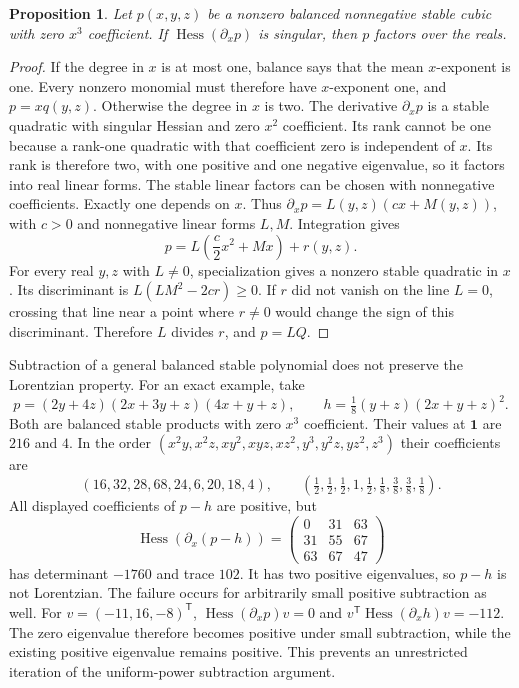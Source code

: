 \documentclass[11pt,a4paper]{article}
\newtheorem{proposition}[theorem]{Proposition}
\theoremstyle{definition}
\theoremstyle{remark}
\newcommand{\T}{\mathsf{T}}
\begin{document}
\begin{proposition}\label{prop:lp-cubic-rigidity}
Let $p(x,y,z)$ be a nonzero balanced nonnegative stable cubic with zero $x^3$ coefficient.
If $\operatorname{Hess}(\partial_xp)$ is singular, then $p$ factors over the reals.
\end{proposition}
\begin{proof}
If the degree in $x$ is at most one, balance says that the mean $x$-exponent is one.
Every nonzero monomial must therefore have $x$-exponent one, and $p=xq(y,z)$.
Otherwise the degree in $x$ is two.
The derivative $\partial_xp$ is a stable quadratic with singular Hessian and zero $x^2$ coefficient.
Its rank cannot be one because a rank-one quadratic with that coefficient zero is independent of $x$.
Its rank is therefore two, with one positive and one negative eigenvalue, so it factors into real linear forms.
The stable linear factors can be chosen with nonnegative coefficients.
Exactly one depends on $x$.
Thus $\partial_xp=L(y,z)(cx+M(y,z))$, with $c>0$ and nonnegative linear forms $L,M$.
Integration gives
\[
 p=L\left(\frac c2x^2+Mx\right)+r(y,z).
\]
For every real $y,z$ with $L\ne0$, specialization gives a nonzero stable quadratic in $x$.
Its discriminant is $L(LM^2-2cr)\ge0$.
If $r$ did not vanish on the line $L=0$, crossing that line near a point where $r\ne0$ would change the sign of this discriminant.
Therefore $L$ divides $r$, and $p=LQ$.
\end{proof}

Subtraction of a general balanced stable polynomial does not preserve the Lorentzian property.
For an exact example, take
\[
 p=(2y+4z)(2x+3y+z)(4x+y+z),\qquad
 h=\tfrac18(y+z)(2x+y+z)^2.
\]
Both are balanced stable products with zero $x^3$ coefficient.
Their values at $\mathbf1$ are $216$ and $4$.
In the order $(x^2y,x^2z,xy^2,xyz,xz^2,y^3,y^2z,yz^2,z^3)$ their coefficients are
\[
 (16,32,28,68,24,6,20,18,4),\qquad
 (\tfrac12,\tfrac12,\tfrac12,1,\tfrac12,\tfrac18,\tfrac38,\tfrac38,\tfrac18).
\]
All displayed coefficients of $p-h$ are positive, but
\[
 \operatorname{Hess}(\partial_x(p-h))=
 \begin{pmatrix}0&31&63\\31&55&67\\63&67&47\end{pmatrix}
\]
has determinant $-1760$ and trace $102$.
It has two positive eigenvalues, so $p-h$ is not Lorentzian.
The failure occurs for arbitrarily small positive subtraction as well.
For $v=(-11,16,-8)^\T$,
$\operatorname{Hess}(\partial_xp)v=0$ and
$v^\T\operatorname{Hess}(\partial_xh)v=-112$.
The zero eigenvalue therefore becomes positive under small subtraction, while the existing positive eigenvalue remains positive.
This prevents an unrestricted iteration of the uniform-power subtraction argument.
\end{document}
